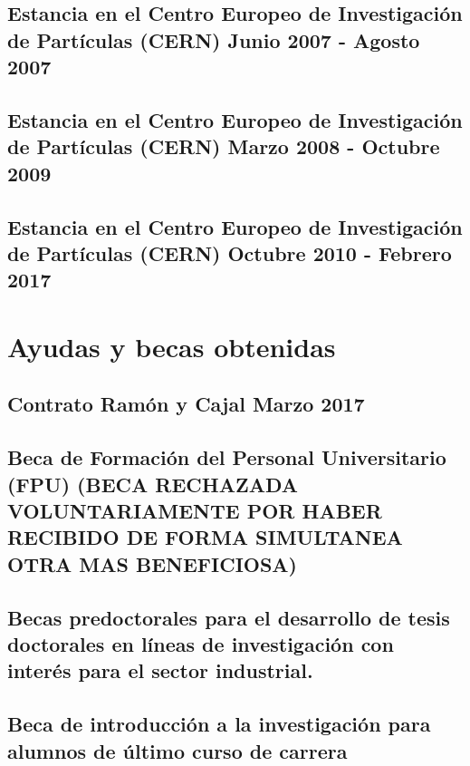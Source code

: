 \documentclass[a4paper, 11pt, twoside, openright]{report}
\begin{document}
\subsection{Estancia en el Centro Europeo de Investigación de Partículas (CERN) Junio 2007 - Agosto 2007}

\subsection{Estancia en el Centro Europeo de Investigación de Partículas (CERN) Marzo 2008 - Octubre 2009}

\subsection{Estancia en el Centro Europeo de Investigación de Partículas (CERN) Octubre 2010 - Febrero 2017}




\section{Ayudas y becas obtenidas}
\subsection{Contrato Ramón y Cajal Marzo 2017}

\subsection{Beca de Formación del Personal Universitario (FPU) (BECA RECHAZADA VOLUNTARIAMENTE POR HABER RECIBIDO DE FORMA SIMULTANEA OTRA MAS BENEFICIOSA)}

\subsection{Becas predoctorales para el desarrollo de tesis doctorales en líneas de investigación con interés para el sector industrial.}

\subsection{Beca de introducción a la investigación para alumnos de último curso de carrera}

\end{document}
